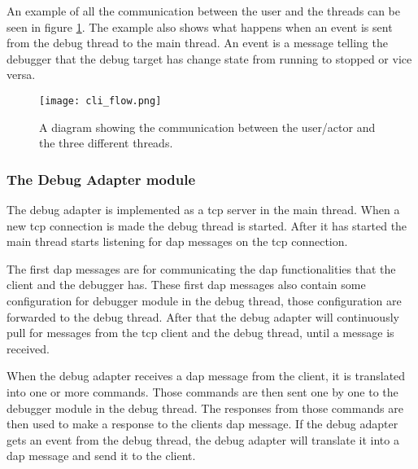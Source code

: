 An example of all the communication between the user and the threads can be seen in figure \ref{fig:cliflow}.
The example also shows what happens when an event is sent from the debug thread to the main thread.
An event is a message telling the debugger that the debug target has change state from running to stopped or vice versa.


\begin{figure}[h]
	\centering
	\texttt{[image: cli\_flow.png]}
	\caption{A diagram showing the communication between the user/actor and the three different threads.}
	\label{fig:cliflow}
\end{figure}




\subsubsection{The Debug Adapter module}


The debug adapter is implemented as a \gls{tcp} server in the main thread.
When a new \gls{tcp} connection is made the debug thread is started.
After it has started the main thread starts listening for \gls{dap} messages on the \gls{tcp} connection.


The first \gls{dap} messages are for communicating the \gls{dap} functionalities that the client and the debugger has.
These first \gls{dap} messages also contain some configuration for debugger module in the debug thread, those configuration are forwarded to the debug thread.
After that the debug adapter will continuously pull for messages from the \gls{tcp} client and the debug thread, until a message is received.


When the debug adapter receives a \gls{dap} message from the client, it is translated into one or more commands.
Those commands are then sent one by one to the debugger module in the debug thread.
The responses from those commands are then used to make a response to the clients \gls{dap} message.
If the debug adapter gets an event from the debug thread, the debug adapter will translate it into a \gls{dap} message and send it to the client.








